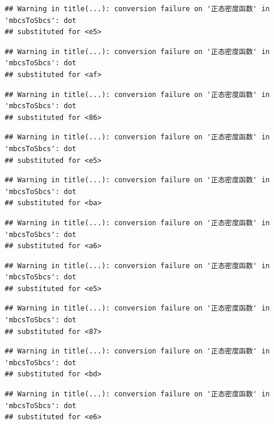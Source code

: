 \documentclass[
]{book}
\begin{document}
\begin{verbatim}
## Warning in title(...): conversion failure on '正态密度函数' in 'mbcsToSbcs': dot
## substituted for <e5>
\end{verbatim}

\begin{verbatim}
## Warning in title(...): conversion failure on '正态密度函数' in 'mbcsToSbcs': dot
## substituted for <af>
\end{verbatim}

\begin{verbatim}
## Warning in title(...): conversion failure on '正态密度函数' in 'mbcsToSbcs': dot
## substituted for <86>
\end{verbatim}

\begin{verbatim}
## Warning in title(...): conversion failure on '正态密度函数' in 'mbcsToSbcs': dot
## substituted for <e5>
\end{verbatim}

\begin{verbatim}
## Warning in title(...): conversion failure on '正态密度函数' in 'mbcsToSbcs': dot
## substituted for <ba>
\end{verbatim}

\begin{verbatim}
## Warning in title(...): conversion failure on '正态密度函数' in 'mbcsToSbcs': dot
## substituted for <a6>
\end{verbatim}

\begin{verbatim}
## Warning in title(...): conversion failure on '正态密度函数' in 'mbcsToSbcs': dot
## substituted for <e5>
\end{verbatim}

\begin{verbatim}
## Warning in title(...): conversion failure on '正态密度函数' in 'mbcsToSbcs': dot
## substituted for <87>
\end{verbatim}

\begin{verbatim}
## Warning in title(...): conversion failure on '正态密度函数' in 'mbcsToSbcs': dot
## substituted for <bd>
\end{verbatim}

\begin{verbatim}
## Warning in title(...): conversion failure on '正态密度函数' in 'mbcsToSbcs': dot
## substituted for <e6>
\end{verbatim}
\end{document}
